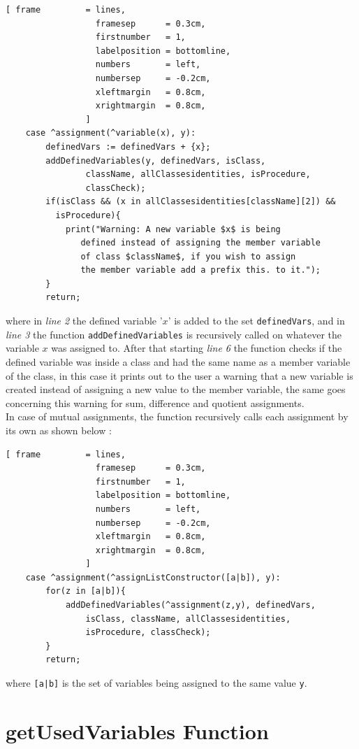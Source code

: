 \documentclass[11pt]{report}
\begin{document}
\begin{Verbatim}[ frame         = lines, 
                  framesep      = 0.3cm, 
                  firstnumber   = 1,
                  labelposition = bottomline,
                  numbers       = left,
                  numbersep     = -0.2cm,
                  xleftmargin   = 0.8cm,
                  xrightmargin  = 0.8cm,
                ]
    case ^assignment(^variable(x), y):
		definedVars := definedVars + {x};
		addDefinedVariables(y, definedVars, isClass,
		        className, allClassesidentities, isProcedure,
		        classCheck);
		if(isClass && (x in allClassesidentities[className][2]) && 
		  isProcedure){
			print("Warning: A new variable $x$ is being
			   defined instead of assigning the member variable 
			   of class $className$, if you wish to assign
			   the member variable add a prefix this. to it.");
		}
		return;
\end{Verbatim}
where in \textsl{line 2} the defined variable '$x$' is added to the set \texttt{definedVars}, and in \textsl{line 3} the function \texttt{addDefinedVariables} is recursively called on whatever the variable $x$ was assigned to. After that starting \textsl{line 6} the function checks if the defined variable was inside a class and had the same name as a member variable of the class, in this case it prints out to the user a warning that a new variable is created instead of assigning a new value to the member variable, the same goes concerning this warning for sum, difference and quotient assignments.
\\

In case of mutual assignments, the function recursively calls each assignment by its own as shown below :

\begin{Verbatim}[ frame         = lines, 
                  framesep      = 0.3cm, 
                  firstnumber   = 1,
                  labelposition = bottomline,
                  numbers       = left,
                  numbersep     = -0.2cm,
                  xleftmargin   = 0.8cm,
                  xrightmargin  = 0.8cm,
                ]
    case ^assignment(^assignListConstructor([a|b]), y):
		for(z in [a|b]){
			addDefinedVariables(^assignment(z,y), definedVars,
			    isClass, className, allClassesidentities, 
			    isProcedure, classCheck);
		}
		return;
\end{Verbatim}
where \texttt{[a|b]} is the set of variables being assigned to the same value \texttt{y}.

\section{getUsedVariables Function}
\end{document}
